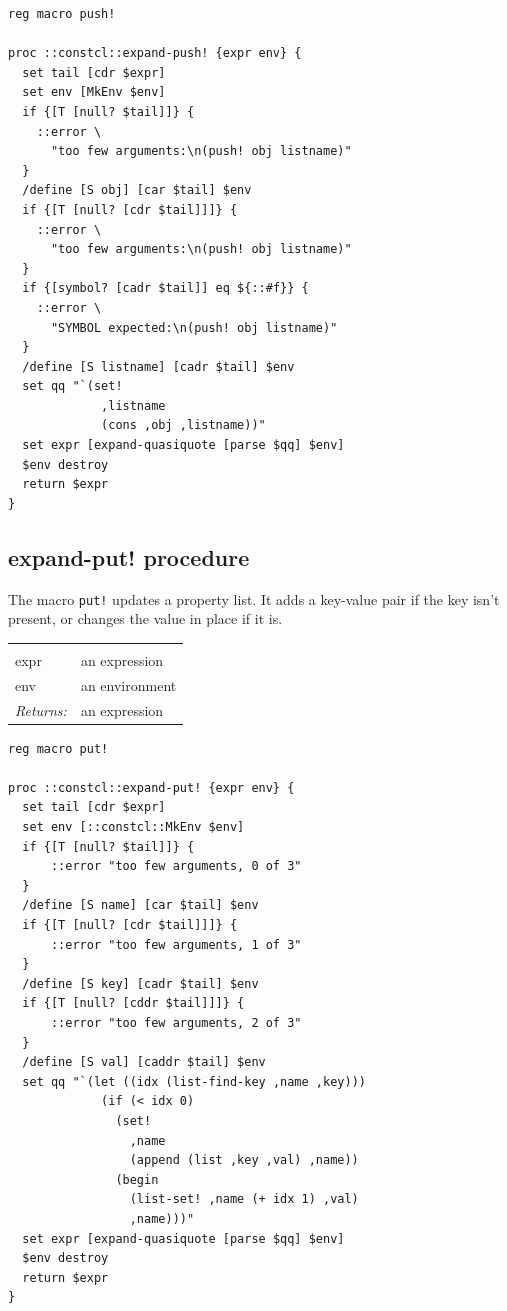 \documentclass[a5paper,draft]{memoir}
\begin{document}
\begin{lstlisting}
reg macro push!

proc ::constcl::expand-push! {expr env} {
  set tail [cdr $expr]
  set env [MkEnv $env]
  if {[T [null? $tail]]} {
    ::error \
      "too few arguments:\n(push! obj listname)"
  }
  /define [S obj] [car $tail] $env
  if {[T [null? [cdr $tail]]]} {
    ::error \
      "too few arguments:\n(push! obj listname)"
  }
  if {[symbol? [cadr $tail]] eq ${::#f}} {
    ::error \
      "SYMBOL expected:\n(push! obj listname)"
  }
  /define [S listname] [cadr $tail] $env
  set qq "`(set!
             ,listname
             (cons ,obj ,listname))"
  set expr [expand-quasiquote [parse $qq] $env]
  $env destroy
  return $expr
}
\end{lstlisting}

\subsection{expand-put! procedure}
\label{expandput-procedure}

The macro \texttt{put!} updates a property list. It adds a key-value pair if the key isn't present, or changes the value in place if it is.

\noindent\begin{tabular}{ |p{1.9cm} p{6.5cm}| }
\hline
\rowcolor[HTML]{CCCCCC} \multicolumn{2}{|l|}{\textbf{expand-put! (internal)}} \\
expr & an expression \\
env & an environment \\
\textit{Returns:} & an expression \\
\hline
\end{tabular}

\begin{lstlisting}
reg macro put!

proc ::constcl::expand-put! {expr env} {
  set tail [cdr $expr]
  set env [::constcl::MkEnv $env]
  if {[T [null? $tail]]} {
      ::error "too few arguments, 0 of 3"
  }
  /define [S name] [car $tail] $env
  if {[T [null? [cdr $tail]]]} {
      ::error "too few arguments, 1 of 3"
  }
  /define [S key] [cadr $tail] $env
  if {[T [null? [cddr $tail]]]} {
      ::error "too few arguments, 2 of 3"
  }
  /define [S val] [caddr $tail] $env
  set qq "`(let ((idx (list-find-key ,name ,key)))
             (if (< idx 0)
               (set!
                 ,name
                 (append (list ,key ,val) ,name))
               (begin
                 (list-set! ,name (+ idx 1) ,val)
                 ,name)))"
  set expr [expand-quasiquote [parse $qq] $env]
  $env destroy
  return $expr
}
\end{lstlisting}
\end{document}
